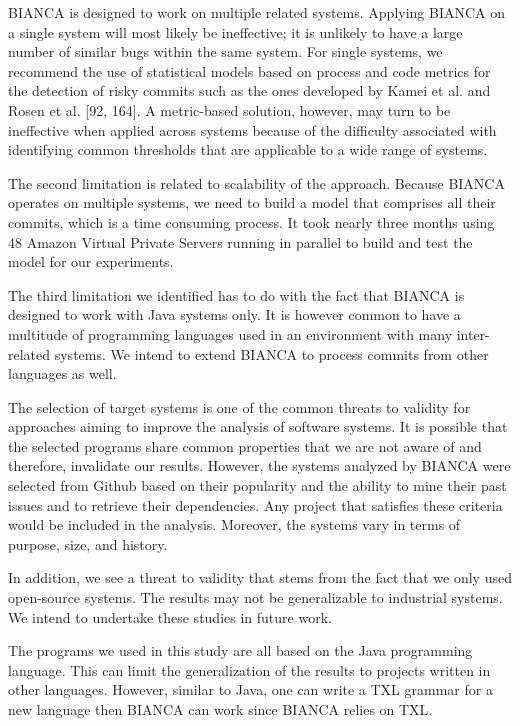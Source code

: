 \documentclass[12pt]{report}
\begin{document}
BIANCA is designed to work on multiple related systems. Applying BIANCA
on a single system will most likely be ineffective; it is unlikely to
have a large number of similar bugs within the same system. For single
systems, we recommend the use of statistical models based on process and
code metrics for the detection of risky commits such as the ones
developed by Kamei et al. and Rosen et al. {[}92, 164{]}. A metric-based
solution, however, may turn to be ineffective when applied across
systems because of the difficulty associated with identifying common
thresholds that are applicable to a wide range of systems.

The second limitation is related to scalability of the approach. Because
BIANCA operates on multiple systems, we need to build a model that
comprises all their commits, which is a time consuming process. It took
nearly three months using 48 Amazon Virtual Private Servers running in
parallel to build and test the model for our experiments.

The third limitation we identified has to do with the fact that BIANCA
is designed to work with Java systems only. It is however common to have
a multitude of programming languages used in an environment with many
inter-related systems. We intend to extend BIANCA to process commits
from other languages as well.

The selection of target systems is one of the common threats to validity
for approaches aiming to improve the analysis of software systems. It is
possible that the selected programs share common properties that we are
not aware of and therefore, invalidate our results. However, the systems
analyzed by BIANCA were selected from Github based on their popularity
and the ability to mine their past issues and to retrieve their
dependencies. Any project that satisfies these criteria would be
included in the analysis. Moreover, the systems vary in terms of
purpose, size, and history.

In addition, we see a threat to validity that stems from the fact that
we only used open-source systems. The results may not be generalizable
to industrial systems. We intend to undertake these studies in future
work.

The programs we used in this study are all based on the Java programming
language. This can limit the generalization of the results to projects
written in other languages. However, similar to Java, one can write a
TXL grammar for a new language then BIANCA can work since BIANCA relies
on TXL.
\end{document}
